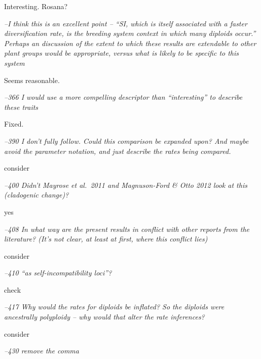 \documentclass[11pt]{article}
\renewenvironment{quote}{\bigskip\noindent\itshape\ignorespaces}{\smallskip}
\begin{document}
Interesting. Rosana? %

\begin{quote}
--I think this is an excellent point -- ``SI, which is itself associated with a faster diversification rate, is the breeding system context in which many diploids occur.''
Perhaps an discussion of the extent to which these results are extendable to other plant groups would be appropriate, versus what is likely to be specific to this system
\end{quote}

Seems reasonable. %

\begin{quote}
--366  I would use a more compelling descriptor than ``interesting'' to describe these traits
\end{quote}

Fixed. %

\begin{quote}
--390  I don't fully follow.
Could this comparison be expanded upon?
And maybe avoid the parameter notation, and just describe the rates being compared.
\end{quote}

consider %

\begin{quote}
--400  Didn't Mayrose et al.\ 2011 and Magnuson-Ford \& Otto 2012 look at this (cladogenic change)?
\end{quote}

yes %

\begin{quote}
--408  In what way are the present results in conflict with other reports from the literature?
(It's not clear, at least at first, where this conflict lies)
\end{quote}

consider %

\begin{quote}
--410  ``as self-incompatibility loci''?
\end{quote}

check %

\begin{quote}
--417  Why would the rates for diploids be inflated?
So the diploids were ancestrally polyploidy -- why would that alter the rate inferences?
\end{quote}

consider %

\begin{quote}
--430  remove the comma
\end{quote}
\end{document}
